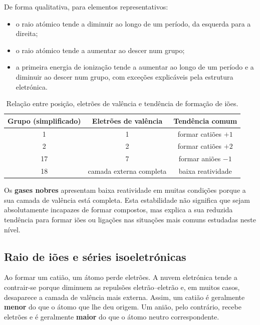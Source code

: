 \documentclass[11pt,a4paper,oneside]{book}
\begin{document}
De forma qualitativa, para elementos representativos:
\begin{itemize}
  \item o raio atómico tende a diminuir ao longo de um período, da esquerda para a direita;
  \item o raio atómico tende a aumentar ao descer num grupo;
  \item a primeira energia de ionização tende a aumentar ao longo de um período e a diminuir ao descer num grupo, com exceções explicáveis pela estrutura eletrónica.
\end{itemize}

\begin{table}[H]
\centering
\caption{Relação entre posição, eletrões de valência e tendência de formação de iões.}
\begin{tabular}{ccc}
\toprule
Grupo (simplificado) & Eletrões de valência & Tendência comum \\
\midrule
1 & 1 & formar catiões $+1$ \\
2 & 2 & formar catiões $+2$ \\
17 & 7 & formar aniões $-1$ \\
18 & camada externa completa & baixa reatividade \\
\bottomrule
\end{tabular}
\end{table}

Os \textbf{gases nobres} apresentam baixa reatividade em muitas condições porque a sua camada de valência está completa. Esta estabilidade não significa que sejam absolutamente incapazes de formar compostos, mas explica a sua reduzida tendência para formar iões ou ligações nas situações mais comuns estudadas neste nível.


\subsection*{Raio de iões e séries isoeletrónicas}
Ao formar um catião, um átomo perde eletrões. A nuvem eletrónica tende a contrair-se porque diminuem as repulsões eletrão--eletrão e, em muitos casos, desaparece a camada de valência mais externa. Assim, um catião é geralmente \textbf{menor} do que o átomo que lhe deu origem. Um anião, pelo contrário, recebe eletrões e é geralmente \textbf{maior} do que o átomo neutro correspondente.
\end{document}
